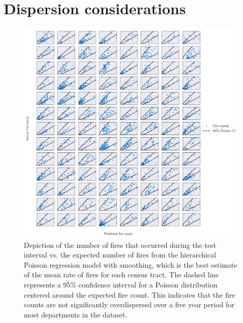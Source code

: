 \documentclass{svjour3}
\begin{document}
\section{Dispersion considerations}
\label{dispersion}
  \begin{figure}[htb] \centering
\includegraphics[width=1\textwidth]{figures/dispersion.pdf}
\caption{Depiction of the number of fires that occurred during the test interval vs. the expected number of fires from the hierarchical Poisson regression model with smoothing, which is the best estimate of the mean rate of fires for each census tract. The dashed line represents a 95\% confidence interval for a Poisson distribution centered around the expected fire count. This indicates that the fire counts are not significantly overdispersed over a five year period for most departments in the dataset.}
\label{fig:dispersion}
\end{figure}
\clearpage


\end{document}
